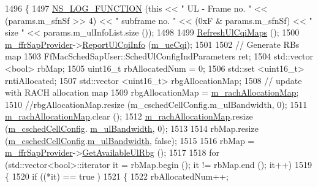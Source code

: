 \begin{DoxyCode}
1496 \{
1497   \hyperlink{log-macros-disabled_8h_a90b90d5bad1f39cb1b64923ea94c0761}{NS\_LOG\_FUNCTION} (\textcolor{keyword}{this} << \textcolor{stringliteral}{" UL - Frame no. "} << (params.m\_sfnSf >> 4) << \textcolor{stringliteral}{" subframe no. "} 
      << (0xF & params.m\_sfnSf) << \textcolor{stringliteral}{" size "} << params.m\_ulInfoList.size ());
1498 
1499   \hyperlink{classns3_1_1TdTbfqFfMacScheduler_a98ee5d1cb33162511118b7da222be604}{RefreshUlCqiMaps} ();
1500   \hyperlink{classns3_1_1TdTbfqFfMacScheduler_a9db8ce15b6803fe859e5c2908cd00e14}{m\_ffrSapProvider}->\hyperlink{classns3_1_1LteFfrSapProvider_a14e6bcaf7db6afcb42f75122717313b1}{ReportUlCqiInfo} (\hyperlink{classns3_1_1TdTbfqFfMacScheduler_a5cf85878fa75fd31bdc63527492e9270}{m\_ueCqi});
1501 
1502   \textcolor{comment}{// Generate RBs map}
1503   FfMacSchedSapUser::SchedUlConfigIndParameters ret;
1504   std::vector <bool> rbMap;
1505   uint16\_t rbAllocatedNum = 0;
1506   std::set <uint16\_t> rntiAllocated;
1507   std::vector <uint16\_t> rbgAllocationMap;
1508   \textcolor{comment}{// update with RACH allocation map}
1509   rbgAllocationMap = \hyperlink{classns3_1_1TdTbfqFfMacScheduler_a09760afce6c2b248fbc5cbcffb9dede5}{m\_rachAllocationMap};
1510   \textcolor{comment}{//rbgAllocationMap.resize (m\_cschedCellConfig.m\_ulBandwidth, 0);}
1511   \hyperlink{classns3_1_1TdTbfqFfMacScheduler_a09760afce6c2b248fbc5cbcffb9dede5}{m\_rachAllocationMap}.clear ();
1512   \hyperlink{classns3_1_1TdTbfqFfMacScheduler_a09760afce6c2b248fbc5cbcffb9dede5}{m\_rachAllocationMap}.resize (\hyperlink{classns3_1_1TdTbfqFfMacScheduler_a3ac3e4b1b3818ff204d6ff6c89c19f4d}{m\_cschedCellConfig}.
      \hyperlink{structns3_1_1FfMacCschedSapProvider_1_1CschedCellConfigReqParameters_a5ab5b102878e6e7e7727a14af4a64d2f}{m\_ulBandwidth}, 0);
1513 
1514   rbMap.resize (\hyperlink{classns3_1_1TdTbfqFfMacScheduler_a3ac3e4b1b3818ff204d6ff6c89c19f4d}{m\_cschedCellConfig}.\hyperlink{structns3_1_1FfMacCschedSapProvider_1_1CschedCellConfigReqParameters_a5ab5b102878e6e7e7727a14af4a64d2f}{m\_ulBandwidth}, \textcolor{keyword}{false});
1515 
1516   rbMap = \hyperlink{classns3_1_1TdTbfqFfMacScheduler_a9db8ce15b6803fe859e5c2908cd00e14}{m\_ffrSapProvider}->\hyperlink{classns3_1_1LteFfrSapProvider_aafd23b22a27ec83e03d54795c122d175}{GetAvailableUlRbg} ();
1517 
1518   \textcolor{keywordflow}{for} (std::vector<bool>::iterator it = rbMap.begin (); it != rbMap.end (); it++)
1519     \{
1520       \textcolor{keywordflow}{if} ((*it) == true )
1521         \{
1522           rbAllocatedNum++;

\end{DoxyCode}
